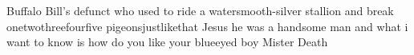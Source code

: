 
Buffalo Bill's
defunct
who used to
ride a watersmooth-silver
stallion
and break onetwothreefourfive pigeonsjustlikethat
Jesus
he was a handsome man
and what i want to know is
how do you like your blueeyed boy
Mister Death

